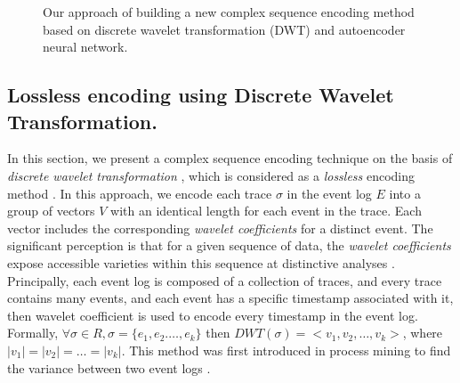 \begin{figure}[htb]
	\begin{center}
		\caption[Wavelet complex Sequence encoding]{Our approach of building a new complex sequence encoding method based on discrete wavelet transformation (DWT) and autoencoder neural network.}
		\label{fig:dwt1}
	\end{center}
\end{figure}


\subsection{Lossless encoding using Discrete Wavelet Transformation.}

In this section, we present a complex sequence encoding technique on the basis of \textit{discrete wavelet transformation} \cite{weeks2003discrete}, which is considered as a \textit{lossless} encoding method \cite{taymouri2019business}. In this approach, we encode each trace $\sigma$ in the event log $E$ into a group of vectors $V$ with an identical length for each event in the trace. Each vector includes the corresponding \textit{wavelet coefficients} for a distinct event. The significant perception is that for a given sequence of data, the \textit{wavelet coefficients} expose accessible varieties within this sequence at distinctive analyses \cite{taymouri2019business}.  Principally, each event log is composed of a collection of traces, and every trace contains many events, and each event has a specific timestamp associated with it, then wavelet coefficient is used to encode every timestamp in the event log. Formally, $\forall \sigma \in R, \sigma = \{e_1, e_2. \dots, e_k\}$ then $DWT(\sigma) = <v_1, v_2, \dots, v_k>$, where $|v_1| = |v_2| = \dots = |v_k|$. This method was first introduced in process mining to find the variance between two event logs \cite{taymouri2019business}.


